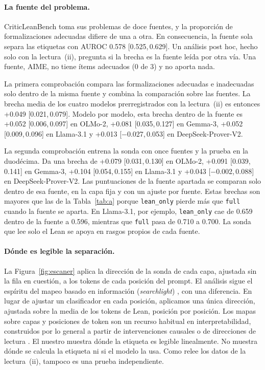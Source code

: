 \documentclass[10pt]{article}
\newcommand{\vr}[1]{\texttt{#1}}
\newcommand{\ic}[2]{[#1,\,#2]}
\begin{document}
\paragraph{La fuente del problema.}
CriticLeanBench toma sus problemas de doce fuentes, y la proporción de formalizaciones adecuadas difiere de una a
otra. En consecuencia, la fuente sola separa las etiquetas con AUROC 0.578 \ic{0.525}{0.629}. Un análisis post hoc,
hecho solo con la lectura~(ii), pregunta si la brecha es la fuente leída por otra vía. Una fuente, AIME, no tiene
ítems adecuados (0 de 3) y no aporta nada.

La primera comprobación compara las formalizaciones adecuadas e inadecuadas solo dentro de la misma fuente y
combina la comparación sobre las fuentes. La brecha media de los cuatro modelos prerregistrados con la
lectura~(ii) es entonces +0.049 \ic{0.021}{0.079}. Modelo por modelo, esta brecha dentro de la fuente es +0.052
\ic{0.006}{0.097} en OLMo-2, +0.081 \ic{0.035}{0.127} en Gemma-3, +0.052 \ic{0.009}{0.096} en Llama-3.1 y +0.013
\ic{−0.027}{0.053} en DeepSeek-Prover-V2.

La segunda comprobación entrena la sonda con once fuentes y la prueba en la duodécima. Da una brecha de +0.079
\ic{0.031}{0.130} en OLMo-2, +0.091 \ic{0.039}{0.141} en Gemma-3, +0.104 \ic{0.054}{0.155} en Llama-3.1 y +0.043
\ic{−0.002}{0.088} en DeepSeek-Prover-V2. Las puntuaciones de la fuente apartada se comparan solo dentro de esa
fuente, en la capa fija y con un ajuste por fuente. Estas brechas son mayores que las de la Tabla~\ref{tab:a}
porque \vr{lean\_only} pierde más que \vr{full} cuando la fuente se aparta. En Llama-3.1, por ejemplo,
\vr{lean\_only} cae de 0.659 dentro de la fuente a 0.596, mientras que \vr{full} pasa de 0.710 a 0.700. La sonda
que lee solo el Lean se apoya en rasgos propios de cada fuente.

\paragraph{Dónde es legible la separación.}
La Figura~\ref{fig:escaner} aplica la dirección de la sonda de cada capa, ajustada sin la fila en cuestión, a los
tokens de cada posición del prompt. El análisis sigue el espíritu del mapeo basado en información (\emph{searchlight})
\citep{searchlight}, con una diferencia. En lugar de ajustar un clasificador en cada posición, aplicamos una única
dirección, ajustada sobre la media de los tokens de Lean, posición por posición. Los mapas sobre capas y posiciones
de token son un recurso habitual en interpretabilidad, construidos por lo general a partir de intervenciones
causales \citep{meng2022rome,geometry} o de direcciones de lectura \citep{zou2023repe}. El nuestro muestra dónde la
etiqueta es legible linealmente. No muestra dónde se calcula la etiqueta ni si el modelo la usa. Como relee los
datos de la lectura~(ii), tampoco es una prueba independiente.
\end{document}
